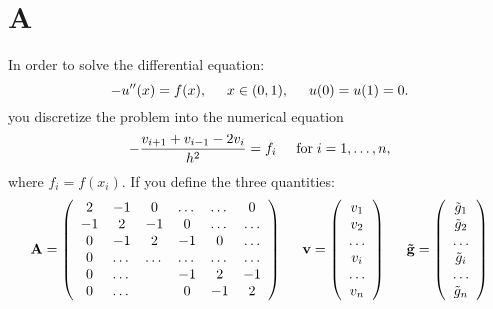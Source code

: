 \documentclass[10pt,a4paper,titlepage]{article}
\begin{document}
\section{A}
In order to solve the differential equation:
\[
-u''(x) = f(x), \hspace{0.5cm} x\in(0,1), \hspace{0.5cm} u(0) = u(1) = 0.
\]
you discretize the problem into the numerical equation
\[
   -\frac{v_{i+1}+v_{i-1}-2v_i}{h^2} = f_i  \hspace{0.5cm} \mathrm{for} \hspace{0.1cm} i=1,\dots, n,
\]
where $f_i=f(x_i)$.
If you define the three quantities:
\[
    {\bf A} = \left(\begin{array}{cccccc}
                           2& -1& 0 &\dots   & \dots &0 \\
                           -1 & 2 & -1 &0 &\dots &\dots \\
                           0&-1 &2 & -1 & 0 & \dots \\
                           0& \dots   & \dots &\dots   &\dots & \dots \\
                           0&\dots   &  &-1 &2& -1 \\
                           0&\dots    &  & 0  &-1 & 2 \\
                      \end{array} \right)
	\hspace{0.5cm}
    {\bf v} = \left(\begin{array}{c}
                           v_1\\
                           v_2\\
                           \dots\\
                           v_i\\
                           \dots\\
                           v_n\\
                      \end{array} \right)
                      \hspace{0.5cm}
	{\bf \tilde{g}} = \left(\begin{array}{c}
                           \tilde{g}_1\\
                           \tilde{g}_2\\
                           \dots\\
                           \tilde{g}_i\\
                           \dots\\
                           \tilde{g}_n\\
                      \end{array} \right)                  
\]
\end{document}
